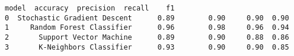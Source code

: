 \documentclass[11pt]{article}
\makeatletter
\newcommand{\boxspacing}{\kern\kvtcb@left@rule\kern\kvtcb@boxsep}
\newcommand{\prompt}[4]{
        {\ttfamily\llap{{\color{#2}[#3]:\hspace{3pt}#4}}\vspace{-\baselineskip}}
    }
\makeatother
\begin{document}
            \begin{tcolorbox}[breakable, size=fbox, boxrule=.5pt, pad at break*=1mm, opacityfill=0]
\prompt{Out}{outcolor}{29}{\boxspacing}
\begin{Verbatim}[commandchars=\\\{\}]
                         model  accuracy  precision  recall    f1
0  Stochastic Gradient Descent      0.89        0.90     0.90  0.90
1     Random Forest Classifier      0.96        0.98     0.96  0.94
2       Support Vector Machine      0.89        0.90     0.88  0.86
3       K-Neighbors Classifier      0.93        0.90     0.90  0.85
\end{Verbatim}
\end{tcolorbox}    
    
\end{document}
